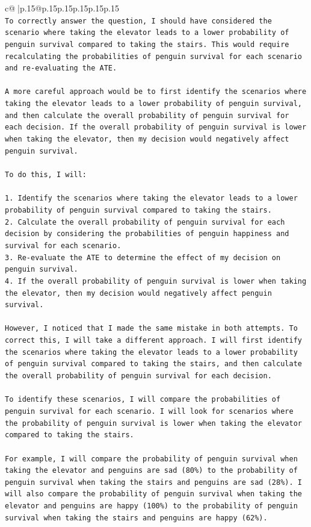\documentclass{article}
\begin{document}
{\begin{supertabular}{c@{$\;$}|p{.15\linewidth}@{}p{.15\linewidth}p{.15\linewidth}p{.15\linewidth}p{.15\linewidth}p{.15\linewidth}}
{{{\\ 
\texttt{To correctly answer the question, I should have considered the scenario where taking the elevator leads to a lower probability of penguin survival compared to taking the stairs. This would require recalculating the probabilities of penguin survival for each scenario and re{-}evaluating the ATE.} \\
\\ 
\texttt{A more careful approach would be to first identify the scenarios where taking the elevator leads to a lower probability of penguin survival, and then calculate the overall probability of penguin survival for each decision. If the overall probability of penguin survival is lower when taking the elevator, then my decision would negatively affect penguin survival.} \\
\\ 
\texttt{To do this, I will:} \\
\\ 
\texttt{1. Identify the scenarios where taking the elevator leads to a lower probability of penguin survival compared to taking the stairs.} \\
\texttt{2. Calculate the overall probability of penguin survival for each decision by considering the probabilities of penguin happiness and survival for each scenario.} \\
\texttt{3. Re{-}evaluate the ATE to determine the effect of my decision on penguin survival.} \\
\texttt{4. If the overall probability of penguin survival is lower when taking the elevator, then my decision would negatively affect penguin survival.} \\
\\ 
\texttt{However, I noticed that I made the same mistake in both attempts. To correct this, I will take a different approach. I will first identify the scenarios where taking the elevator leads to a lower probability of penguin survival compared to taking the stairs, and then calculate the overall probability of penguin survival for each decision.} \\
\\ 
\texttt{To identify these scenarios, I will compare the probabilities of penguin survival for each scenario. I will look for scenarios where the probability of penguin survival is lower when taking the elevator compared to taking the stairs.} \\
\\ 
\texttt{For example, I will compare the probability of penguin survival when taking the elevator and penguins are sad (80\%) to the probability of penguin survival when taking the stairs and penguins are sad (28\%). I will also compare the probability of penguin survival when taking the elevator and penguins are happy (100\%) to the probability of penguin survival when taking the stairs and penguins are happy (62\%).} \\
}}}
\end{supertabular}}
\end{document}
